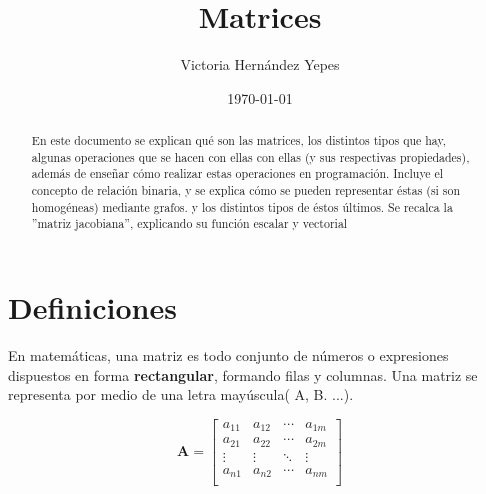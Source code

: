 \documentclass[10pt]{article}
\title{Matrices}
\author{Victoria Hernández Yepes}
\date{\today}
\begin{document}
\maketitle \tableofcontents 


\begin{abstract}
En este documento se explican qué son las matrices, los distintos tipos que hay, algunas operaciones que se hacen con ellas con ellas (y sus respectivas propiedades), además de enseñar cómo realizar estas operaciones en programación. Incluye el concepto de relación binaria, y se explica cómo se pueden representar éstas (si son homogéneas) mediante grafos. y los distintos tipos de éstos últimos. Se recalca la ''matriz jacobiana'', explicando su función escalar y vectorial
\end{abstract}

\section{Definiciones}
En matemáticas, una matriz es todo conjunto de números o expresiones dispuestos en forma \textbf{rectangular}, formando filas y columnas. Una matriz se representa por medio de una letra mayúscula( A, B. ...).

\begin{equation}
\textbf{A} = \left[
\begin{array}{cccc}
a_{11} & a_{12} & \cdots & a_{1m} \\
a_{21} & a_{22} & \cdots & a_{2m} \\
\vdots & \vdots & \ddots & \vdots \\
a_{n1} & a_{n2} & \cdots & a_{nm} \\
\end{array}
\right]
\end{equation}
\end{document}
